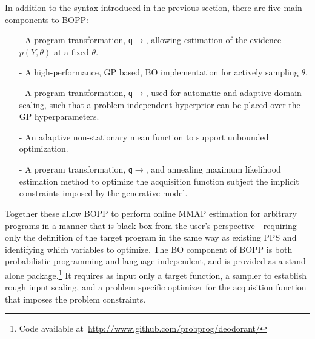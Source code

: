 
In addition to the syntax introduced in the previous section, there are five main components to BOPP:
\begin{itemize}
	\setlength\itemsep{0.1em}
	\item[-] A program transformation, \texttt{q}$\rightarrow$\qmarg, allowing estimation of the evidence $p(Y,\theta)$ at a fixed $\theta$.
	\item[-] A high-performance, GP based, BO implementation for actively sampling $\theta$.
	\item[-] A program transformation, \texttt{q}$\rightarrow$\qprior,  used for automatic and adaptive domain scaling, such that a problem-independent hyperprior can be placed over the GP hyperparameters.
	\item[-] An adaptive non-stationary mean function to support unbounded optimization.
	\item[-] A program transformation, \texttt{q}$\rightarrow$\qacq, and annealing maximum likelihood estimation method to optimize the acquisition function subject the implicit constraints imposed by the generative model.
\end{itemize}
Together these allow BOPP to perform online MMAP estimation for arbitrary programs in a manner that is black-box from the user's perspective - requiring only the definition of the target program in the same way as existing PPS and identifying which variables to optimize.  The BO component of BOPP is both probabilistic programming and language independent, and is provided as a stand-alone package.\footnote{Code available at~\href{http://www.github.com/probprog/deodorant/}{\url{http://www.github.com/probprog/deodorant/}}}  It requires as input only a target function, a sampler to establish rough input scaling, and a problem specific optimizer for the acquisition function that imposes the problem constraints.  %


